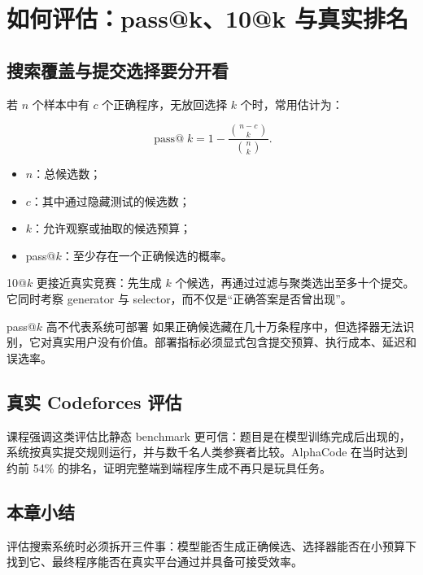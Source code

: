 \section{如何评估：pass@k、10@k 与真实排名}

\subsection{搜索覆盖与提交选择要分开看}


若 $n$ 个样本中有 $c$ 个正确程序，无放回选择 $k$ 个时，常用估计为：

$$
\operatorname{pass@}k=1-\frac{\binom{n-c}{k}}{\binom{n}{k}}.
$$

\begin{itemize}
    \item $n$：总候选数；
    \item $c$：其中通过隐藏测试的候选数；
    \item $k$：允许观察或抽取的候选预算；
    \item pass@$k$：至少存在一个正确候选的概率。
\end{itemize}

10@$k$ 更接近真实竞赛：先生成 $k$ 个候选，再通过过滤与聚类选出至多十个提交。它同时考察 generator 与 selector，而不仅是“正确答案是否曾出现”。


\begin{warningbox}{pass@$k$ 高不代表系统可部署}
如果正确候选藏在几十万条程序中，但选择器无法识别，它对真实用户没有价值。部署指标必须显式包含提交预算、执行成本、延迟和误选率。
\end{warningbox}

\subsection{真实 Codeforces 评估}


课程强调这类评估比静态 benchmark 更可信：题目是在模型训练完成后出现的，系统按真实提交规则运行，并与数千名人类参赛者比较。AlphaCode 在当时达到约前 54\% 的排名，证明完整端到端程序生成不再只是玩具任务。


\subsection{本章小结}

评估搜索系统时必须拆开三件事：模型能否生成正确候选、选择器能否在小预算下找到它、最终程序能否在真实平台通过并具备可接受效率。

